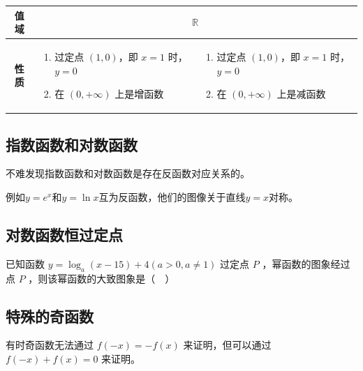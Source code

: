 \begin{center}
\begin{tabular}{|c|m{5.8cm}|m{5.8cm}|}
        \hline
        \textbf{值域}  & \multicolumn{2}{c|}{$\mathbb{R}$}   \\
        \hline
        \textbf{性质}  &
        \begin{enumerate}
            \item 过定点 $(1, 0)$，即 $x=1$ 时，$y=0$
            \item 在 $(0, +\infty)$ 上是增函数
        \end{enumerate}
                     &
        \begin{enumerate}
            \item 过定点 $(1, 0)$，即 $x=1$ 时，$y=0$
            \item 在 $(0, +\infty)$ 上是减函数
        \end{enumerate}
        \\
        \hline
    \end{tabular}
\end{center}

\subsection{指数函数和对数函数}

不难发现指数函数和对数函数是存在反函数对应关系的。

例如$y=e^x$和$y=\ln x$互为反函数，他们的图像关于直线$y=x$对称。

\subsection{对数函数恒过定点}

\begin{example}
    已知函数 $y=\log _a(x-15)+4(a>0, a \neq 1)$ 过定点 $P$ ，幂函数的图象经过点 $P$ ，则该幂函数的大致图象是（$\quad$）
\end{example}

\begin{figure} [H]
    \centering
    \resizebox{0.7\textwidth}{!}{}
\end{figure}

\subsection{特殊的奇函数}

\begin{theorem}[特殊的奇函数]
    有时奇函数无法通过 $f(-x)=-f(x)$ 来证明，但可以通过 $f(-x) + f(x) = 0$ 来证明。
\end{theorem}

